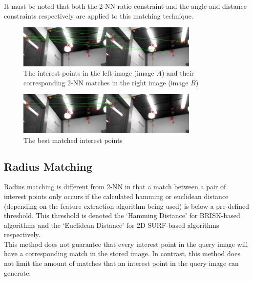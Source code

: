 It must be noted that both the 2-NN ratio constraint and the angle and distance constraints respectively are applied to this matching technique.\\

 \begin{figure}[h!] 
  \centering
    \includegraphics[width=0.8\textwidth]{../Drawings/Matching/feature_matching/dataset1_without_validation_knn.jpg}
    \caption{The interest points in the left image (image $A$) and their corresponding 2-NN matches in the right image (image $B$)}
    \label{fig:2nn_matching}
\end{figure}

 \begin{figure}[h!] 
  \centering
    \includegraphics[width=0.8\textwidth]{../Drawings/Matching/feature_matching/dataset1_without_validation_knn_best.jpg}
    \caption{The best matched interest points}
    \label{fig:2nn_best_match}
\end{figure}

\subsection{Radius Matching}
\label{sec:radius}
Radius matching is different from 2-NN in that a match between a pair of interest points only occurs if the calculated hamming or euclidean distance (depending on the feature extraction algorithm being used) is below a pre-defined threshold. This threshold is denoted the `Hamming Distance' for BRISK-based algorithms and the `Euclidean Distance' for 2D SURF-based algorithms respectively. \\

This method does not guarantee that every interest point in the query image will have a corresponding match in the stored image. In contrast, this method does not limit the amount of matches that an interest point in the query image can generate.\\

